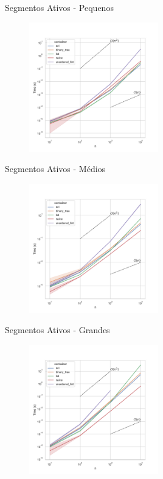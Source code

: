 \documentclass[aspectratio=169,usenames,dvipsnames]{beamer}
\begin{document}
\begin{frame}{Segmentos Ativos - Pequenos}
      \begin{figure}
        \includegraphics[width=0.5\textwidth]{figs/tempos/plot_random_small_time.pdf}
      \end{figure}
\end{frame}

\begin{frame}{Segmentos Ativos - Médios}
      \begin{figure}
        \includegraphics[width=0.5\textwidth]{figs/tempos/plot_random_medium_time.pdf}
      \end{figure}
\end{frame}

\begin{frame}{Segmentos Ativos - Grandes}
      \begin{figure}
        \includegraphics[width=0.5\textwidth]{figs/tempos/plot_random_big_time.pdf}
      \end{figure}
\end{frame}
\end{document}
